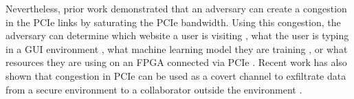 Nevertheless, prior work demonstrated that an adversary can create a congestion in the PCIe links by saturating the PCIe bandwidth.
Using this congestion, the adversary can determine which website a user is visiting \cite{tan2021invisible, side2022lockeddown}, what the user is typing in a GUI environment \cite{tan2021invisible}, what machine learning model they are training \cite{tan2021invisible}, or what resources they are using on an FPGA connected via PCIe \cite{giechaskiel2022cross}.
Recent work has also shown that congestion in PCIe can be used as a covert channel to exfiltrate data from a secure environment to a collaborator outside the environment \cite{giechaskiel2022cross, khaliq2021timing}.

\begin{comment}
https://www.linkedin.com/pulse/pci-express-primer-3-transaction-layer-simon-southwell/
\end{comment}